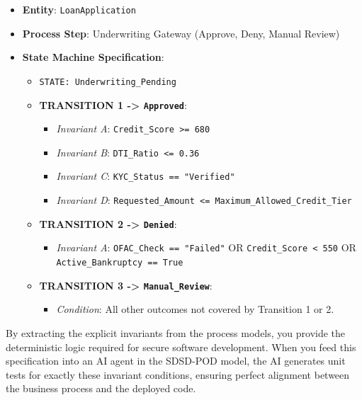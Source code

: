 \documentclass[
  11pt,
  openany,
  oneside]{book}
\providecommand{\tightlist}{%
  \setlength{\itemsep}{0pt}\setlength{\parskip}{0pt}}
\begin{document}
\begin{itemize}
\tightlist
\item
  \textbf{Entity}: \texttt{LoanApplication}
\item
  \textbf{Process Step}: Underwriting Gateway (Approve, Deny, Manual
  Review)
\item
  \textbf{State Machine Specification}:

  \begin{itemize}
  \tightlist
  \item
    \texttt{STATE:\ Underwriting\_Pending}
  \item
    \textbf{TRANSITION 1 -\textgreater{} \texttt{Approved}}:

    \begin{itemize}
    \tightlist
    \item
      \emph{Invariant A}: \texttt{Credit\_Score\ \textgreater{}=\ 680}
    \item
      \emph{Invariant B}: \texttt{DTI\_Ratio\ \textless{}=\ 0.36}
    \item
      \emph{Invariant C}: \texttt{KYC\_Status\ ==\ "Verified"}
    \item
      \emph{Invariant D}:
      \texttt{Requested\_Amount\ \textless{}=\ Maximum\_Allowed\_Credit\_Tier}
    \end{itemize}
  \item
    \textbf{TRANSITION 2 -\textgreater{} \texttt{Denied}}:

    \begin{itemize}
    \tightlist
    \item
      \emph{Invariant A}: \texttt{OFAC\_Check\ ==\ "Failed"} OR
      \texttt{Credit\_Score\ \textless{}\ 550} OR
      \texttt{Active\_Bankruptcy\ ==\ True}
    \end{itemize}
  \item
    \textbf{TRANSITION 3 -\textgreater{} \texttt{Manual\_Review}}:

    \begin{itemize}
    \tightlist
    \item
      \emph{Condition}: All other outcomes not covered by Transition 1
      or 2.
    \end{itemize}
  \end{itemize}
\end{itemize}

By extracting the explicit invariants from the process models, you
provide the deterministic logic required for secure software
development. When you feed this specification into an AI agent in the
SDSD-POD model, the AI generates unit tests for exactly these invariant
conditions, ensuring perfect alignment between the business process and
the deployed code.
\end{document}
